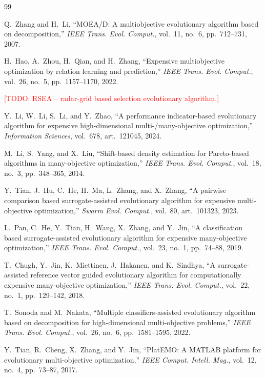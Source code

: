 \documentclass[final,5p,times,twocolumn]{elsarticle}
\newcommand{\TODO}[1]{\textcolor{red}{[TODO: #1]}}
\begin{document}
\begin{thebibliography}{99}

Q.~Zhang and H.~Li,
``MOEA/D: A multiobjective evolutionary algorithm based on decomposition,''
\emph{IEEE Trans. Evol. Comput.}, vol.~11, no.~6, pp.~712--731, 2007.

H.~Hao, A.~Zhou, H.~Qian, and H.~Zhang,
``Expensive multiobjective optimization by relation learning and prediction,''
\emph{IEEE Trans. Evol. Comput.}, vol.~26, no.~5, pp.~1157--1170, 2022.

\TODO{RSEA -- radar-grid based selection evolutionary algorithm.}

Y.~Li, W.~Li, S.~Li, and Y.~Zhao,
``A performance indicator-based evolutionary algorithm for expensive
high-dimensional multi-/many-objective optimization,''
\emph{Information Sciences}, vol.~678, art.~121045, 2024.

M.~Li, S.~Yang, and X.~Liu,
``Shift-based density estimation for Pareto-based algorithms in
many-objective optimization,''
\emph{IEEE Trans. Evol. Comput.}, vol.~18, no.~3, pp.~348--365, 2014.

Y.~Tian, J.~Hu, C.~He, H.~Ma, L.~Zhang, and X.~Zhang,
``A pairwise comparison based surrogate-assisted evolutionary algorithm for
expensive multi-objective optimization,''
\emph{Swarm Evol. Comput.}, vol.~80, art.~101323, 2023.

L.~Pan, C.~He, Y.~Tian, H.~Wang, X.~Zhang, and Y.~Jin,
``A classification based surrogate-assisted evolutionary algorithm for
expensive many-objective optimization,''
\emph{IEEE Trans. Evol. Comput.}, vol.~23, no.~1, pp.~74--88, 2019.

T.~Chugh, Y.~Jin, K.~Miettinen, J.~Hakanen, and K.~Sindhya,
``A surrogate-assisted reference vector guided evolutionary algorithm for
computationally expensive many-objective optimization,''
\emph{IEEE Trans. Evol. Comput.}, vol.~22, no.~1, pp.~129--142, 2018.

T.~Sonoda and M.~Nakata,
``Multiple classifiers-assisted evolutionary algorithm based on decomposition
for high-dimensional multi-objective problems,''
\emph{IEEE Trans. Evol. Comput.}, vol.~26, no.~6, pp.~1581--1595, 2022.

Y.~Tian, R.~Cheng, X.~Zhang, and Y.~Jin,
``PlatEMO: A MATLAB platform for evolutionary multi-objective optimization,''
\emph{IEEE Comput. Intell. Mag.}, vol.~12, no.~4, pp.~73--87, 2017.

\end{thebibliography}
\end{document}
